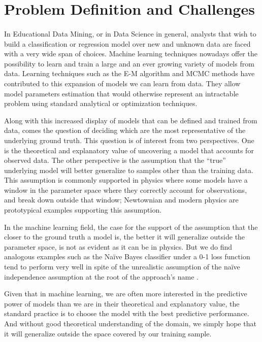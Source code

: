 \label{sec:Introduction} 

\section{Problem Definition and Challenges}
\paragraph{}

In Educational Data Mining, or in Data Science in general, analysts that wish to build a classification or regression model over new and unknown data are faced with a very wide span of choices. Machine learning techniques nowadays offer the possibility to learn and train a large and an ever growing variety of models from data. Learning techniques such as the E-M algorithm and MCMC methods have contributed to this expansion of models we can learn from data. They allow model parameters estimation that would otherwise represent an intractable problem using standard analytical or optimization techniques.

Along with this increased display of models that can be defined and trained from data, comes the question of deciding which are the most representative of the underlying ground truth. This question is of interest from two perspectives. One is the theoretical and explanatory value of uncovering a model that accounts for observed data. The other perspective is the assumption that the ``true'' underlying model will better generalize to samples other than the training data. This assumption is commonly supported in physics where some models have a window in the parameter space where they correctly account for observations, and break down outside that window; Newtownian and modern physics are prototypical examples supporting this assumption. 

In the machine learning field, the case for the support of the assumption that the closer to the ground truth a model is, the better it will generalize outside the parameter space, is not as evident as it can be in physics. But we do find analogous examples such as the Naïve Bayes classifier under a 0-1 loss function tend to perform very well in spite of the unrealistic assumption of the naïve independence assumption at the root of the approach's name \citep{domingos1997}.

Given that in machine learning, we are often more interested in the predictive power of models than we are in their theoretical and explanatory value, the standard practice is to choose the model with the best predictive performance. And without good theoretical understanding of the domain, we simply hope that it will generalize outside the space covered by our training sample. 


